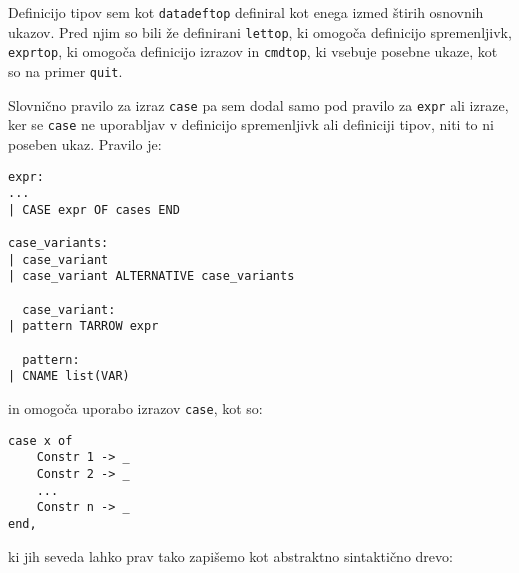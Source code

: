 \documentclass[12pt,a4paper,openany]{book}
\begin{document}
Definicijo tipov sem kot \lstinline{datadeftop} definiral kot enega izmed štirih osnovnih ukazov. Pred njim so bili že definirani \lstinline{lettop}, ki omogoča definicijo 
spremenljivk, \lstinline{exprtop}, ki omogoča definicijo izrazov in \lstinline{cmdtop}, ki vsebuje posebne ukaze, kot so na primer \lstinline{quit}.

Slovnično pravilo za izraz \lstinline{case} pa sem dodal samo pod pravilo za \lstinline{expr} ali izraze, ker se \lstinline{case} ne uporabljav v definicijo spremenljivk ali
definiciji tipov, niti to ni poseben ukaz. Pravilo je: 
\begin{lstlisting}
expr:
...
| CASE expr OF cases END

case_variants:
| case_variant
| case_variant ALTERNATIVE case_variants

  case_variant:
| pattern TARROW expr

  pattern:
| CNAME list(VAR)
\end{lstlisting}
in omogoča uporabo izrazov \lstinline{case}, kot so:
\begin{lstlisting}
case x of 
    Constr 1 -> _
    Constr 2 -> _
    ...
    Constr n -> _
end,
\end{lstlisting}
ki jih seveda lahko prav tako zapišemo kot abstraktno sintaktično drevo:
\begin{center}
\end{center}
\end{document}

